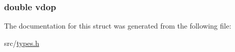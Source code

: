 \subsubsection[{\texorpdfstring{vdop}{vdop}}]{\setlength{\rightskip}{0pt plus 5cm}double vdop}\hypertarget{struct_full_g_p_s_data_a4001a0f05d0c57ebdb066d738098bff7}{}\label{struct_full_g_p_s_data_a4001a0f05d0c57ebdb066d738098bff7}


The documentation for this struct was generated from the following file\+:\begin{DoxyCompactItemize}
\item 
src/\hyperlink{types_8h}{types.\+h}\end{DoxyCompactItemize}
